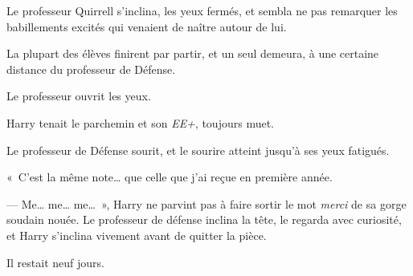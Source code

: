 Le professeur Quirrell s'inclina, les yeux fermés, et sembla ne pas remarquer les babillements excités qui venaient de naître autour de lui.

La plupart des élèves finirent par partir, et un seul demeura, à une certaine distance du professeur de Défense.

Le professeur ouvrit les yeux.

Harry tenait le parchemin et son \emph{EE+}, toujours muet.

Le professeur de Défense sourit, et le sourire atteint jusqu'à ses yeux fatigués.

«~C'est la même note… que celle que j'ai reçue en première année.

--- Me… me… me…~», Harry ne parvint pas à faire sortir le mot \emph{merci} de sa gorge soudain nouée. Le professeur de défense inclina la tête, le regarda avec curiosité, et Harry s'inclina vivement avant de quitter la pièce.

Il restait neuf jours.
